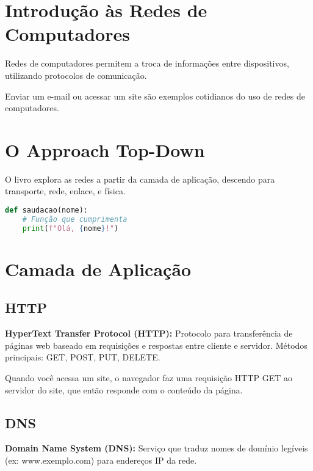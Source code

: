 \section{Introdução às Redes de Computadores}

\begin{defbox}
Redes de computadores permitem a troca de informações entre dispositivos, utilizando protocolos de comunicação.
\end{defbox}

\begin{examplebox}
Enviar um e-mail ou acessar um site são exemplos cotidianos do uso de redes de computadores.
\end{examplebox}

\section{O Approach Top-Down}
\begin{notebox}
O livro explora as redes a partir da camada de aplicação, descendo para transporte, rede, enlace, e física.
\end{notebox}

\begin{lstlisting}[style=dracula, language=Python]
def saudacao(nome):
    # Função que cumprimenta
    print(f"Olá, {nome}!")
\end{lstlisting}

\section{Camada de Aplicação}

\subsection{HTTP}
\begin{protocolbox}
\textbf{HyperText Transfer Protocol (HTTP):} Protocolo para transferência de páginas web baseado em requisições e respostas entre cliente e servidor. Métodos principais: GET, POST, PUT, DELETE.
\end{protocolbox}

\begin{examplebox}
Quando você acessa um site, o navegador faz uma requisição HTTP GET ao servidor do site, que então responde com o conteúdo da página.
\end{examplebox}

\subsection{DNS}
\begin{protocolbox}
\textbf{Domain Name System (DNS):} Serviço que traduz nomes de domínio legíveis (ex: www.exemplo.com) para endereços IP da rede.
\end{protocolbox}

